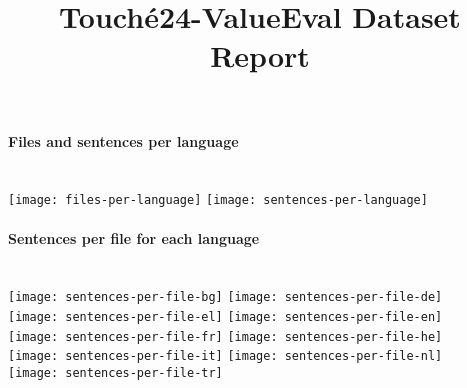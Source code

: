 \documentclass[a4paper]{article}
\title{Touch{\'e}24-ValueEval Dataset Report}
\newenvironment{figures}[1]{\noindent\begin{minipage}{\linewidth}\paragraph{#1}\noindent\\[\baselineskip]}{\end{minipage}}
\begin{document}
\maketitle



\begin{figures}{Files and sentences per language}
\texttt{[image: files-per-language]}%
\hfill%
\texttt{[image: sentences-per-language]}
\end{figures}



\begin{figures}{Sentences per file for each language}
\texttt{[image: sentences-per-file-bg]}%
\hfill%
\texttt{[image: sentences-per-file-de]}\\[4ex]
\texttt{[image: sentences-per-file-el]}%
\hfill%
\texttt{[image: sentences-per-file-en]}\\[4ex]
\texttt{[image: sentences-per-file-fr]}%
\hfill%
\texttt{[image: sentences-per-file-he]}\\[4ex]
\texttt{[image: sentences-per-file-it]}%
\hfill%
\texttt{[image: sentences-per-file-nl]}\\[4ex]
\texttt{[image: sentences-per-file-tr]}
\end{figures}
\end{document}
